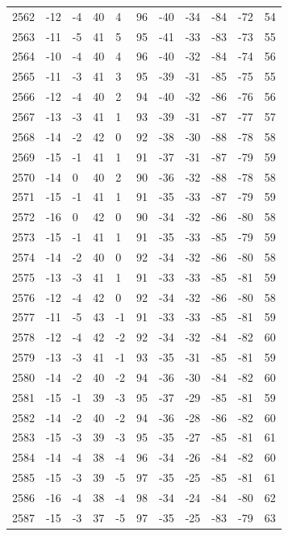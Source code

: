 \begin{table}[H]
\begin{tabular}{lllllllllll}
2562 & -12 & -4 & 40 & 4 & 96 & -40 & -34 & -84 & -72 & 54 \\
2563 & -11 & -5 & 41 & 5 & 95 & -41 & -33 & -83 & -73 & 55 \\
2564 & -10 & -4 & 40 & 4 & 96 & -40 & -32 & -84 & -74 & 56 \\
2565 & -11 & -3 & 41 & 3 & 95 & -39 & -31 & -85 & -75 & 55 \\
2566 & -12 & -4 & 40 & 2 & 94 & -40 & -32 & -86 & -76 & 56 \\
2567 & -13 & -3 & 41 & 1 & 93 & -39 & -31 & -87 & -77 & 57 \\
2568 & -14 & -2 & 42 & 0 & 92 & -38 & -30 & -88 & -78 & 58 \\
2569 & -15 & -1 & 41 & 1 & 91 & -37 & -31 & -87 & -79 & 59 \\
2570 & -14 & 0 & 40 & 2 & 90 & -36 & -32 & -88 & -78 & 58 \\
2571 & -15 & -1 & 41 & 1 & 91 & -35 & -33 & -87 & -79 & 59 \\
2572 & -16 & 0 & 42 & 0 & 90 & -34 & -32 & -86 & -80 & 58 \\
2573 & -15 & -1 & 41 & 1 & 91 & -35 & -33 & -85 & -79 & 59 \\
2574 & -14 & -2 & 40 & 0 & 92 & -34 & -32 & -86 & -80 & 58 \\
2575 & -13 & -3 & 41 & 1 & 91 & -33 & -33 & -85 & -81 & 59 \\
2576 & -12 & -4 & 42 & 0 & 92 & -34 & -32 & -86 & -80 & 58 \\
2577 & -11 & -5 & 43 & -1 & 91 & -33 & -33 & -85 & -81 & 59 \\
2578 & -12 & -4 & 42 & -2 & 92 & -34 & -32 & -84 & -82 & 60 \\
2579 & -13 & -3 & 41 & -1 & 93 & -35 & -31 & -85 & -81 & 59 \\
2580 & -14 & -2 & 40 & -2 & 94 & -36 & -30 & -84 & -82 & 60 \\
2581 & -15 & -1 & 39 & -3 & 95 & -37 & -29 & -85 & -81 & 59 \\
2582 & -14 & -2 & 40 & -2 & 94 & -36 & -28 & -86 & -82 & 60 \\
2583 & -15 & -3 & 39 & -3 & 95 & -35 & -27 & -85 & -81 & 61 \\
2584 & -14 & -4 & 38 & -4 & 96 & -34 & -26 & -84 & -82 & 60 \\
2585 & -15 & -3 & 39 & -5 & 97 & -35 & -25 & -85 & -81 & 61 \\
2586 & -16 & -4 & 38 & -4 & 98 & -34 & -24 & -84 & -80 & 62 \\
2587 & -15 & -3 & 37 & -5 & 97 & -35 & -25 & -83 & -79 & 63 \\

\end{tabular}
\end{table}
